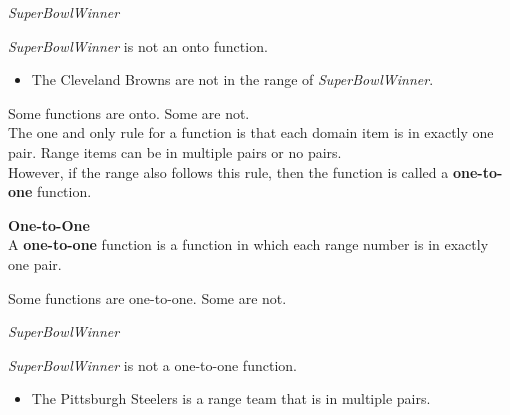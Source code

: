 \documentclass{ximera}
\begin{document}
\begin{example} \textit{SuperBowlWinner}


\textit{SuperBowlWinner} is not an onto function.


\begin{itemize}
\item The Cleveland Browns are not in the range of \textit{SuperBowlWinner}.  
\end{itemize}

\end{example}







Some functions are onto. Some are not. \\




The one and only rule for a function is that each domain item is in exactly one pair.  Range items can be in multiple pairs or no pairs. \\

However, if the range also follows this rule, then the function is called a \textbf{one-to-one} function.



\begin{definition} \textbf{\textcolor{green!50!black}{One-to-One}} \\

A \textbf{one-to-one} function is a function in which each range number is in exactly one pair.

\end{definition}




Some functions are one-to-one. Some are not. \\














\begin{example} \textit{SuperBowlWinner}


\textit{SuperBowlWinner} is not a one-to-one function.


\begin{itemize}
\item The Pittsburgh Steelers is a range team that is in multiple pairs. 
\end{itemize}

\end{example}
\end{document}
